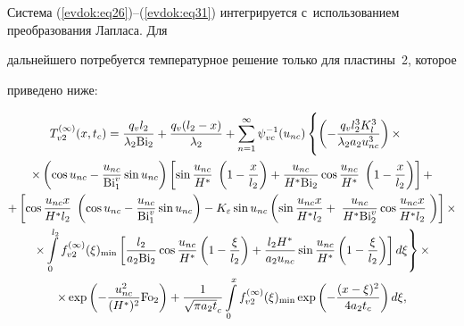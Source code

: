 Система (\ref{evdok:eq26})--(\ref{evdok:eq31}) интегрируется с~использованием преобразования Лапласа. Для 

дальнейшего потребуется температурное решение только для пластины~2, которое 

приведено ниже:

\begin{multline}

T_{v2}^{(\infty )} (x,t_c ) = \frac{q_v l_2 }{\lambda _2 {\rm Bi}_2 } + \frac{q_v 

(l_2 - x)}{\lambda _2 } + \sum\limits_{n = 1}^\infty {\psi _{vc}^{ - 1} 

(u_{nc} )\left\{ {\left( { - \frac{q_v l_2^3 K_l^3 }{\lambda _2 a_2 u_{nc}^3 

}} \right)\times } \phantom{\int\limits_0^{l_2 }} \right.} 

\\ 

\times \left( {\cos u_{nc} - \frac{u_{nc} }{{\rm Bi}_1^v }\sin u_{nc} } 

\right)\left[ {\sin \frac{u_{nc} }{H^\ast }\;\left( {1 - \frac{x}{l_2 }} 

\right) + \frac{u_{nc} }{H^\ast {\rm Bi}_2 }\cos \frac{u_{nc} }{H^\ast }\;\left( 

{1 - \frac{x}{l_2 }} \right)} \right] + 

\\

 + \left[ {\cos \frac{u_{nc} x}{H^\ast l_2 }\;\left( {\cos u_{nc} - 

\frac{u_{nc} }{{\rm Bi}_1^v }\sin u_{nc} } \right) - K_\varepsilon \sin u_{nc} 

\left( {\sin \frac{u_{nc} x}{H^\ast l_2 } + \;\frac{u_{nc} }{H^\ast {\rm Bi}_2^v 

}\cos \frac{u_{nc} x}{H^\ast l_2 }\;} \right)} \right]\times 

\\

\left. {\times \int\limits_0^{l_2 } {f_{v2}^{(\infty )} (\xi )_{\min } } 

\left[ {\frac{l_2 }{a_2 {\rm Bi}_2 }\cos \frac{u_{nc} }{H^\ast }\left( {1 - 

\frac{\xi }{l_2 }} \right) + \frac{l_2 H^\ast }{a_2 u_{nc} }\sin 

\frac{u_{nc} }{H^\ast }\left( {1 - \frac{\xi }{l_2 }} \right)} \right]d\xi } 

\right\} \times 

\\

\label{evdok:eq32}

\times \exp \left( { - \frac{u_{nc}^2 }{(H^\ast )^2}{\rm Fo}_2 } \right) + 

\frac{1}{\sqrt {\pi a_2 t} _c }\int\limits_0^x {f_{v2}^{(\infty )} (\xi 

)_{\min } } \exp \left( { - \frac{(x - \xi )^2}{4a_2 t_c }} \right)d\xi ,

\end{multline}

